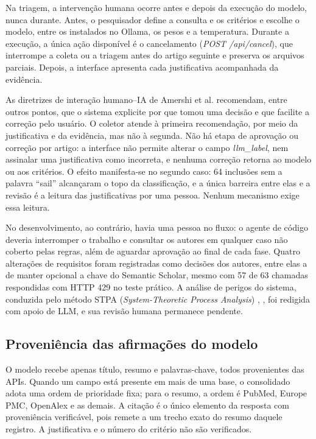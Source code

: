 \documentclass[10pt,a4paper,twocolumn]{article}
\newcommand{\cod}[1]{\textit{#1}}
\begin{document}
Na triagem, a intervenção humana ocorre antes e depois da execução do modelo, nunca durante. Antes, o pesquisador define a consulta e os critérios e escolhe o modelo, entre os instalados no Ollama, os pesos e a temperatura. Durante a execução, a única ação disponível é o cancelamento (\cod{POST /api/cancel}), que interrompe a coleta ou a triagem antes do artigo seguinte e preserva os arquivos parciais. Depois, a interface apresenta cada justificativa acompanhada da evidência.

As diretrizes de interação humano--IA de Amershi et al. \cite{amershi} recomendam, entre outros pontos, que o sistema explicite por que tomou uma decisão e que facilite a correção pelo usuário. O coletor atende à primeira recomendação, por meio da justificativa e da evidência, mas não à segunda. Não há etapa de aprovação ou correção por artigo: a interface não permite alterar o campo \cod{llm\_label}, nem assinalar uma justificativa como incorreta, e nenhuma correção retorna ao modelo ou aos critérios. O efeito manifesta-se no segundo caso: 64 inclusões sem a palavra ``sail'' alcançaram o topo da classificação, e a única barreira entre elas e a revisão é a leitura das justificativas por uma pessoa. Nenhum mecanismo exige essa leitura.

No desenvolvimento, ao contrário, havia uma pessoa no fluxo: o agente de código deveria interromper o trabalho e consultar os autores em qualquer caso não coberto pelas regras, além de aguardar aprovação ao final de cada fase. Quatro alterações de requisitos foram registradas como decisões dos autores, entre elas a de manter opcional a chave do Semantic Scholar, mesmo com 57 de 63 chamadas respondidas com HTTP 429 no teste prático. A análise de perigos do sistema, conduzida pelo método STPA (\emph{System-Theoretic Process Analysis}) \cite{leveson}, \cite{stpa}, foi redigida com apoio de LLM, e sua revisão humana permanece pendente.

\subsection{Proveniência das afirmações do modelo}

O modelo recebe apenas título, resumo e palavras-chave, todos provenientes das APIs. Quando um campo está presente em mais de uma base, o consolidado adota uma ordem de prioridade fixa; para o resumo, a ordem é PubMed, Europe PMC, OpenAlex e as demais. A citação é o único elemento da resposta com proveniência verificável, pois remete a um trecho exato do resumo daquele registro. A justificativa e o número do critério não são verificados.
\end{document}

